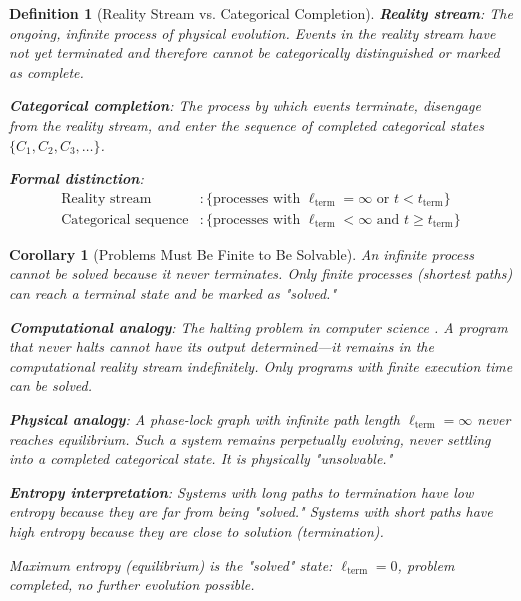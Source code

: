 \documentclass[12pt,a4paper]{article}
\newtheorem{corollary}[theorem]{Corollary}
\newtheorem{definition}[theorem]{Definition}
\theoremstyle{remark}
\begin{document}
\begin{definition}[Reality Stream vs. Categorical Completion]
\textbf{Reality stream}: The ongoing, infinite process of physical evolution. Events in the reality stream have not yet terminated and therefore cannot be categorically distinguished or marked as complete.

\textbf{Categorical completion}: The process by which events terminate, disengage from the reality stream, and enter the sequence of completed categorical states $\{C_1, C_2, C_3, \ldots\}$.

\textbf{Formal distinction}:
\begin{align}
\text{Reality stream} &: \{\text{processes with } \ell_{\text{term}} = \infty \text{ or } t < t_{\text{term}}\} \\
\text{Categorical sequence} &: \{\text{processes with } \ell_{\text{term}} < \infty \text{ and } t \geq t_{\text{term}}\}
\end{align}
\end{definition}

\begin{corollary}[Problems Must Be Finite to Be Solvable]
\label{cor:finite_solvable}
An infinite process cannot be solved because it never terminates. Only finite processes (shortest paths) can reach a terminal state and be marked as "solved."

\textbf{Computational analogy}: The halting problem in computer science \cite{turing1936computable}. A program that never halts cannot have its output determined—it remains in the computational reality stream indefinitely. Only programs with finite execution time can be solved.

\textbf{Physical analogy}: A phase-lock graph with infinite path length $\ell_{\text{term}} = \infty$ never reaches equilibrium. Such a system remains perpetually evolving, never settling into a completed categorical state. It is physically "unsolvable."

\textbf{Entropy interpretation}: Systems with long paths to termination have low entropy because they are far from being "solved." Systems with short paths have high entropy because they are close to solution (termination).

Maximum entropy (equilibrium) is the "solved" state: $\ell_{\text{term}} = 0$, problem completed, no further evolution possible.
\end{corollary}
\end{document}
